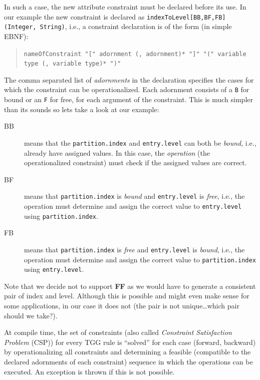 In such a case, the new attribute constraint must be declared before its use. 
In our example the new constraint is declared as \texttt{indexToLevel[BB,BF,FB] (Integer, String)}, i.e., a constraint declaration is of the form (in simple EBNF):
\begin{quote}
\texttt{nameOfConstraint "[" adornment (, adornment)* "]" "(" \newline variable type (, variable type)* ")"}
\end{quote}
The comma separated list of \emph{adornments} in the declaration specifies the cases for which the constraint can be operationalized.
Each adornment consists of a \texttt{B} for bound or an \texttt{F} for free, for each argument of the constraint.
This is much simpler than its sounds so lets take a look at our example:
\begin{description}
\item[BB] means that the \texttt{partition.index} and \texttt{entry.level} can both be \emph{bound}, i.e., already have assigned values.
In this case, the \emph{operation} (the operationalized constraint) must check if the assigned values are correct. 
\item[BF] means that \texttt{partition.index} is \emph{bound} and \texttt{entry.level} is \emph{free}, i.e., the operation must determine and assign the correct value to \texttt{entry.level} using \texttt{partition.index}.
\item[FB] means that \texttt{partition.index} is \emph{free} and \texttt{entry.level} is \emph{bound}, i.e., the operation must determine and assign the correct value to \texttt{parti\-tion.in\-dex} using \texttt{entry.level}. 
\end{description}

Note that we decide not to support \textbf{FF} as we would have to generate a consistent pair of index and level.
Although this is possible and might even make sense for some applications, in our case it does not (the pair is not unique\ldots which pair should we take?).

At compile time, the set of constraints (also called \emph{Constraint Satisfaction Problem} (CSP)) for every TGG rule is ``solved'' for each case (forward, backward) by operationalizing all constraints and determining a feasible (compatible to the declared adornments of each constraint) sequence in which the operations can be executed.
An exception is thrown if this is not possible.
